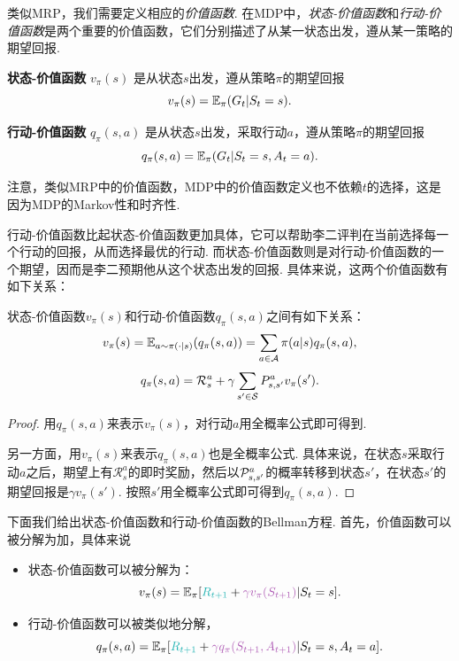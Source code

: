 类似MRP，我们需要定义相应的\emph{价值函数}. 在MDP中，\emph{状态-价值函数}和\emph{行动-价值函数}是两个重要的价值函数，它们分别描述了从某一状态出发，遵从某一策略的期望回报. 

\begin{definition}[价值函数]
\textbf{状态-价值函数} $v_\pi(s)$ 是从状态$s$出发，遵从策略$\pi$的期望回报
    \[v_\pi(s) = \mathbb{E}_\pi(G_t|S_t=s).\]

\textbf{行动-价值函数} $q_\pi(s,a)$ 是从状态$s$出发，采取行动$a$，遵从策略$\pi$的期望回报
    \[q_\pi(s,a) = \mathbb{E}_\pi(G_t|S_t=s,A_t=a).\]
\end{definition}
注意，类似MRP中的价值函数，MDP中的价值函数定义也不依赖$t$的选择，这是因为MDP的Markov性和时齐性. 

行动-价值函数比起状态-价值函数更加具体，它可以帮助李二评判在当前选择每一个行动的回报，从而选择最优的行动. 而状态-价值函数则是对行动-价值函数的一个期望，因而是李二预期他从这个状态出发的回报. 具体来说，这两个价值函数有如下关系：

\begin{proposition}\label{prop:state-action-value}
状态-价值函数$v_\pi(s)$和行动-价值函数$q_\pi(s,a)$之间有如下关系：
    \[v_\pi(s) = \mathbb{E}_{a\sim\pi(\cdot|s)}(q_\pi(s,a))=\sum_{a\in\mathcal A}\pi(a|s)q_\pi(s,a),\]
    \[q_\pi(s,a) =\mathcal R_s^a + \gamma \sum_{s'\in \mathcal S}P_{s,s'}^a v_\pi(s').\]
\end{proposition}
\begin{proof}
    用$q_\pi(s,a)$来表示$v_\pi(s)$，对行动$a$用全概率公式即可得到. 

    另一方面，用$v_\pi(s)$来表示$q_\pi(s,a)$也是全概率公式. 具体来说，在状态$s$采取行动$a$之后，期望上有$\mathcal R_s^a$的即时奖励，然后以$\mathcal P_{s,s'}^a$的概率转移到状态$s'$，在状态$s'$的期望回报是$\gamma v_\pi(s')$. 按照$s'$用全概率公式即可得到$q_\pi(s,a)$.
\end{proof}

下面我们给出状态-价值函数和行动-价值函数的Bellman方程. 首先，价值函数可以被分解为加，具体来说
\begin{itemize}
    \item 状态-价值函数可以被分解为：
    \[v_\pi(s) = \E_\pi[\contrastlight{R_{t+1}} + \light{\gamma v_\pi(S_{t+1})}|S_t=s].\]
    \item 行动-价值函数可以被类似地分解，
\[q_\pi(s,a) = \E_\pi[\contrastlight{R_{t+1}} + \light{\gamma q_\pi(S_{t+1},A_{t+1})}|S_t=s,A_t=a].\]
\end{itemize}

